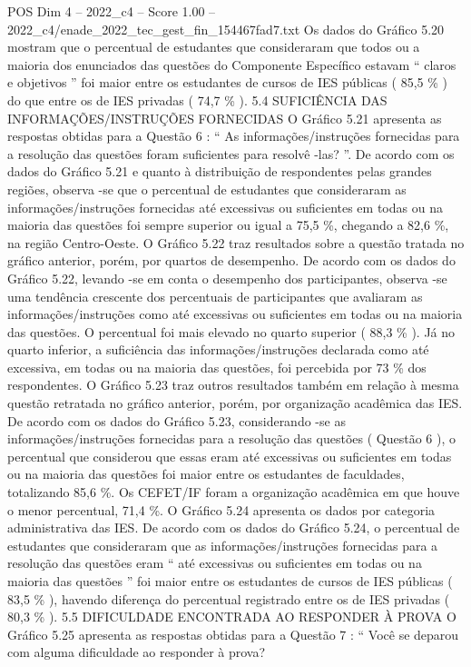 \begin{textsample}{POS Dim 4 – 2022\_c4 – Score 1.00 – 2022\_c4/enade\_2022\_tec\_gest\_fin\_154467fad7.txt}
Os dados do Gráfico 5.20 mostram que o percentual de estudantes que consideraram que todos ou a maioria dos enunciados das questões do Componente Específico estavam “ claros e objetivos ” foi maior entre os estudantes de cursos de IES públicas ( 85,5 \% ) do que entre os de IES privadas ( 74,7 \% ). 5.4 SUFICIÊNCIA DAS INFORMAÇÕES/INSTRUÇÕES FORNECIDAS O Gráfico 5.21 apresenta as respostas obtidas para a Questão 6 : “ As informações/instruções fornecidas para a resolução das questões foram suficientes para resolvê -las? ”.
De acordo com os dados do Gráfico 5.21 e quanto à distribuição de respondentes pelas grandes regiões, observa -se que o percentual de estudantes que consideraram as informações/instruções fornecidas até excessivas ou suficientes em todas ou na maioria das questões foi sempre superior ou igual a 75,5 \%, chegando a 82,6 \%, na região Centro-Oeste.
O Gráfico 5.22 traz resultados sobre a questão tratada no gráfico anterior, porém, por quartos de desempenho.
De acordo com os dados do Gráfico 5.22, levando -se em conta o desempenho dos participantes, observa -se uma tendência crescente dos percentuais de participantes que avaliaram as informações/instruções como até excessivas ou suficientes em todas ou na maioria das questões.
O percentual foi mais elevado no quarto superior ( 88,3 \% ).
Já no quarto inferior, a suficiência das informações/instruções declarada como até excessiva, em todas ou na maioria das questões, foi percebida por 73 \% dos respondentes.
O Gráfico 5.23 traz outros resultados também em relação à mesma questão retratada no gráfico anterior, porém, por organização acadêmica das IES.
De acordo com os dados do Gráfico 5.23, considerando -se as informações/instruções fornecidas para a resolução das questões ( Questão 6 ), o percentual que considerou que essas eram até excessivas ou suficientes em todas ou na maioria das questões foi maior entre os estudantes de faculdades, totalizando 85,6 \%.
Os CEFET/IF foram a organização acadêmica em que houve o menor percentual, 71,4 \%.
O Gráfico 5.24 apresenta os dados por categoria administrativa das IES.
De acordo com os dados do Gráfico 5.24, o percentual de estudantes que consideraram que as informações/instruções fornecidas para a resolução das questões eram “ até excessivas ou suficientes em todas ou na maioria das questões ” foi maior entre os estudantes de cursos de IES públicas ( 83,5 \% ), havendo diferença do percentual registrado entre os de IES privadas ( 80,3 \% ). 5.5 DIFICULDADE ENCONTRADA AO RESPONDER À PROVA O Gráfico 5.25 apresenta as respostas obtidas para a Questão 7 : “ Você se deparou com alguma dificuldade ao responder à prova?

\end{textsample}
